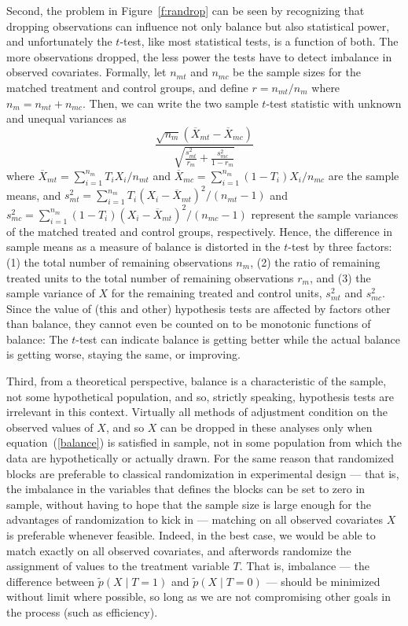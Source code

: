 \documentclass[11pt,titlepage]{article}
\begin{document}
Second, the problem in Figure~\ref{f:randrop} can be seen by
recognizing that dropping observations can influence not only balance
but also statistical power, and unfortunately the $t$-test, like most
statistical tests, is a function of both.  The more observations
dropped, the less power the tests have to detect imbalance in observed
covariates.  Formally, let $n_{mt}$ and $n_{mc}$ be the sample sizes for the
matched treatment and control groups, and define $r=n_{mt}/n_m$ where
$n_m=n_{mt}+n_{mc}$. Then, we can write the two sample $t$-test statistic with
unknown and unequal variances as
\begin{equation}
  \label{ttest} \frac{\sqrt{n_m}(\overline{X}_{mt}-\overline{X}_{mc})}
               {\sqrt{\frac{s^2_{mt}}{r_m} + \frac{s^2_{mc}}{1-r_m}}}
\end{equation}
where $\overline{X}_{mt}=\sum_{i=1}^{n_m} T_i X_i/n_{mt}$ and
$\overline{X}_{mc}=\sum_{i=1}^{n_m} (1-T_i)X_i/n_{mc}$ are the sample
means, and $s^2_{mt}=\sum_{i=1}^{n_m} T_i(X_i -
\overline{X}_{mt})^2/(n_{mt}-1)$ and $s^2_{mc}=\sum_{i=1}^{n_m}
(1-T_i)(X_i - \overline{X}_{mt})^2/(n_{mc}-1)$ represent the sample
variances of the matched treated and control groups, respectively.
Hence, the difference in sample means as a measure of balance is
distorted in the $t$-test by three factors: (1) the total number of
remaining observations $n_m$, (2) the ratio of remaining treated units
to the total number of remaining observations $r_m$, and (3) the
sample variance of $X$ for the remaining treated and control units,
$s_{mt}^2$ and $s_{mc}^2$.  Since the value of (this and other)
hypothesis tests are affected by factors other than balance, they
cannot even be counted on to be monotonic functions of balance: The
$t$-test can indicate balance is getting better while the actual
balance is getting worse, staying the same, or improving.

Third, from a theoretical perspective, balance is a characteristic of
the sample, not some hypothetical population, and so, strictly
speaking, hypothesis tests are irrelevant in this context.  Virtually
all methods of adjustment condition on the observed values of $X$, and
so $X$ can be dropped in these analyses only when
equation~(\ref{balance}) is satisfied in sample, not in some
population from which the data are hypothetically or actually drawn.
For the same reason that randomized blocks are preferable to classical
randomization in experimental design --- that is, the imbalance in the
variables that defines the blocks can be set to zero in sample,
without having to hope that the sample size is large enough for the
advantages of randomization to kick in --- matching on all observed
covariates $X$ is preferable whenever feasible.  Indeed, in the best
case, we would be able to match exactly on all observed covariates,
and afterwords randomize the assignment of values to the treatment
variable $T$.  That is, imbalance --- the difference between $\tilde
p(X\mid T=1)$ and $\tilde p(X\mid T=0)$ --- should be minimized
without limit where possible, so long as we are not compromising other
goals in the process (such as efficiency).
\end{document}

